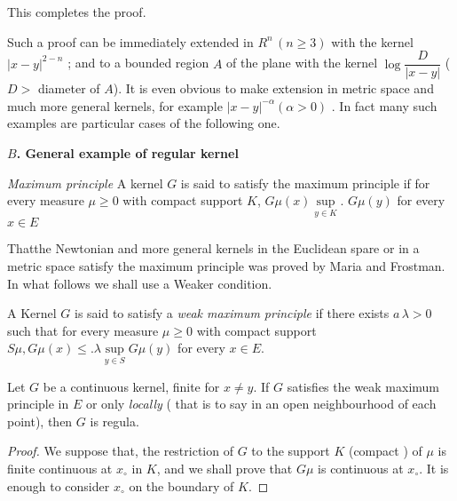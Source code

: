 This completes the proof. 

Such a proof can be immediately extended in $R^n \,(n \geq 3)$ with the
kernel $\big| x - y \big|^{  2-n}$ ; and to a bounded region $A$ of
the plane with the kernel $\log \dfrac{D}{| x - y |}$ ($D >$  diameter
of $A$). It is even obvious to make extension in metric space and much
more general kernels, for example $| x - y |^{- \alpha} (\alpha > 0 )$
. In fact many such examples are particular cases of the following
one.  

\medskip
\noindent
\textbf{$B$. General example of regular kernel }

\begin{defn}\label{p3:chap2:sec6:def9}%
  {\em Maximum principle } A kernel $G$ is said to satisfy the maximum
  principle if for every measure $\mu \geq 0$ with compact support
  $K$, $G \mu (x) \sup\limits _{y \in K}$.  $G \mu (y)$ for every $x \in
  E$ 
\end{defn}

That\pageoriginale the Newtonian and more general kernels in the Euclidean spare or
in a metric space satisfy the maximum principle was proved by Maria
and Frostman. In what follows we shall use a Weaker condition.  

\begin{defn}\label{p3:chap2:sec6:def10}%
  A Kernel $G$ is said to satisfy a {\em weak maximum principle } if
  there exists $a \,\lambda > 0$ such that for every measure $\mu \geq 0$
  with compact support $S \mu,  G \mu (x) \leq.  \lambda \sup
  \limits_{ y \in S} G \mu (y)$  for every $x \in E$.  
\end{defn}

\begin{thm}\label{p3:chap2:sec6:thm2}%
  Let $G$  be a continuous kernel, finite for $x \neq y$. If $G$
  satisfies the weak maximum principle in $E$ or only {\em locally} (
  that is to say in an open neighbourhood of each point), then $G$ is
  regula.  
\end{thm}

\begin{proof}
  We suppose that, the restriction of $G$ to the support $K$ (compact
  ) of $\mu$ is finite continuous at $x _\circ$ in $K$, and we shall
  prove that $G \mu$ is continuous at $x_\circ$. It is enough to
  consider $x_\circ$ on the boundary of $K$.  
\end{proof}

